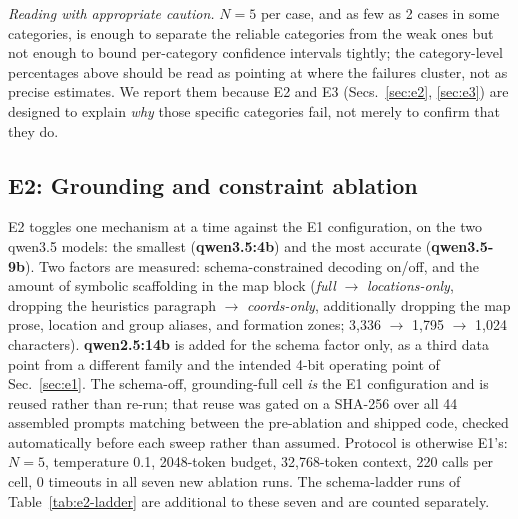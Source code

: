 \documentclass[10pt,twocolumn]{article}
\begin{document}
\emph{Reading with appropriate caution.} $N{=}5$ per case, and as few as 2
cases in some categories, is enough to separate the reliable categories from
the weak ones but not enough to bound per-category confidence intervals
tightly; the category-level percentages above should be read as pointing at
where the failures cluster, not as precise estimates. We report them because
E2 and E3 (Secs.~\ref{sec:e2}, \ref{sec:e3}) are designed to explain \emph{why}
those specific categories fail, not merely to confirm that they do.

\subsection{E2: Grounding and constraint ablation}
\label{sec:res-e2}

E2 toggles one mechanism at a time against the E1 configuration, on the two
qwen3.5 models: the smallest (\textbf{qwen3.5:4b}) and the most accurate
(\textbf{qwen3.5-9b}). Two factors are measured: schema-constrained decoding
on/off, and the amount of symbolic scaffolding in the map block
(\emph{full} $\to$ \emph{locations-only}, dropping the heuristics paragraph
$\to$ \emph{coords-only}, additionally dropping the map prose, location and
group aliases, and formation zones; 3{,}336 $\to$ 1{,}795 $\to$ 1{,}024
characters). \textbf{qwen2.5:14b} is added for the schema factor only, as a
third data point from a different family and the intended 4-bit operating
point of Sec.~\ref{sec:e1}. The schema-off, grounding-full cell \emph{is}
the E1 configuration and is reused rather than re-run; that reuse was gated on
a SHA-256 over all 44 assembled prompts matching between the pre-ablation and
shipped code, checked automatically before each sweep rather than assumed.
Protocol is otherwise E1's: $N{=}5$, temperature 0.1, 2048-token budget,
32{,}768-token context, 220 calls per cell, 0 timeouts in all seven new
ablation runs. The schema-ladder runs of Table~\ref{tab:e2-ladder} are
additional to these seven and are counted separately.
\end{document}

